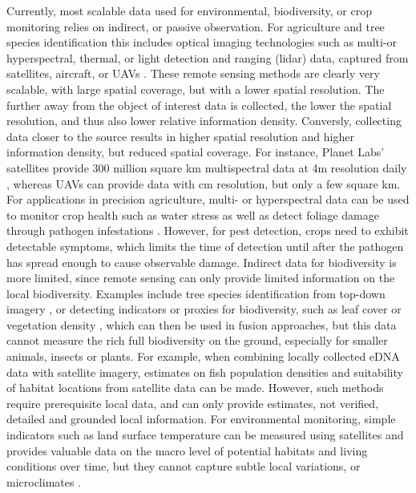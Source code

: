 Currently, most scalable data used for environmental, biodiversity, or crop monitoring relies on indirect, or passive observation. For agriculture and tree species identification this includes optical imaging technologies such as multi-or hyperspectral, thermal, or light detection and ranging (lidar) data, captured from satellites, aircraft, or UAVs \cite{Tsouros2019, Toth2016, Singh2020, Mahlein2018}. 
These remote sensing methods are clearly very scalable, with large spatial coverage, but with a lower spatial resolution. The further away from the object of interest data is collected, the lower the spatial resolution, and thus also lower relative information density. 
Conversly, collecting data closer to the source results in higher spatial resolution and higher information density, but reduced spatial coverage. For instance, Planet Labs' satellites provide 300 million square km multispectral data at 4m resolution daily \cite{Lab}, whereas UAVs can provide data with cm resolution, but only a few square km.
For applications in precision agriculture, multi- or hyperspectral data can be used to monitor crop health such as water stress as well as detect foliage damage through pathogen infestations \cite{Mahlein2018}. However, for pest detection, crops need to exhibit detectable symptoms, which limits the time of detection until after the pathogen has spread enough to cause observable damage. 
Indirect data for biodiversity is more limited, since remote sensing can only provide limited information on the local biodiversity. Examples include tree species identification from top-down imagery \cite{}, or detecting indicators or proxies for biodiversity, such as leaf cover or vegetation density \cite{Skidmore2015}, which can then be used in fusion approaches, but this data cannot measure the rich full biodiversity on the ground, especially for smaller animals, insects or plants. 
For example, when combining locally collected eDNA data with satellite imagery, estimates on fish population densities and suitability of habitat locations from satellite data can be made\cite{Zong2024}. However, such methods require prerequisite local data, and can only provide estimates, not verified, detailed and grounded local information. For environmental monitoring, simple indicators such as land surface temperature can be measured using satellites and provides valuable data on the macro level of potential habitats and living conditions over time, but they cannot capture  subtle local variations, or microclimates \cite{Frenne2021, Zellweger2019AdvancesSensing}.

